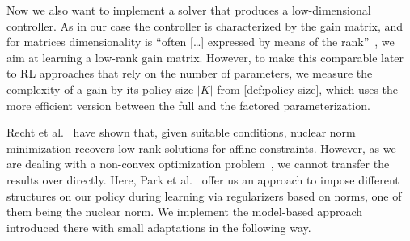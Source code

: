 
Now we also want to implement a solver that produces a low-dimensional controller. As in our
case the controller is characterized by the gain matrix, and for matrices dimensionality is ``often
[\ldots] expressed by means of the rank''~\cite[Sec.~1]{Recht2010Guaranteed}, we aim at learning a low-rank
gain matrix. However, to make this comparable later to RL approaches that rely on the number of parameters,
we measure the complexity of a gain by its policy size $\lvert K \rvert$ from \cref{def:policy-size}, which uses
the more efficient version between the full and the factored parameterization.

Recht et al.~\cite{Recht2010Guaranteed} have shown that, given suitable conditions, nuclear norm minimization recovers
low-rank solutions for affine constraints. However, as we are dealing with a non-convex optimization
problem~\cite{Fazel2018Global}, we cannot transfer the results over directly. Here, Park et al.~\cite{Park2020Structured}
offer us an approach to impose different structures on our policy during learning via regularizers
based on norms, one of them being the nuclear norm. We implement the model-based approach introduced there
with small adaptations in the following way.

